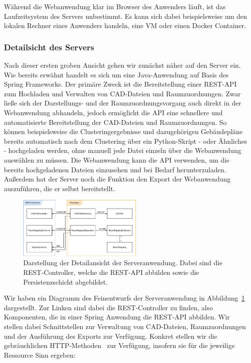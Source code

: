 Während die Webanwendung klar im Browser des Anwenders läuft, ist das Laufzeitsystem des Servers unbestimmt.
Es kann sich dabei beispielsweise um den lokalen Rechner eines Anwenders handeln, eine VM oder einen Docker Container.

\subsubsection{Detailsicht des Servers}
\label{subsubsec:detail-server}

Nach dieser ersten groben Ansicht gehen wir zunächst näher auf den Server ein.
Wie bereits erwähnt handelt es sich um eine Java-Anwendung auf Basis des Spring Frameworks.
Der primäre Zweck ist die Bereitstellung einer REST-API zum Hochladen und Verwalten von CAD-Dateien und Raumzuordnungen.
Zwar ließe sich der Darstellungs- und der Raumzuordnungsvorgang auch direkt in der Webanwendung abhandeln, jedoch ermöglicht die API eine schnellere und automatisierte Bereitstellung der CAD-Dateien und Raumzuordnungen.
So können beispielsweise die Clusteringergebnisse und dazugehörigen Gebäudepläne bereits automatisch nach dem Clustering über ein Python-Skript - oder Ähnliches - hochgeladen werden, ohne manuell jede Datei einzeln über die Webanwendung auswählen zu müssen.
Die Webanwendung kann die API verwenden, um die bereits hochgeladenen Dateien einzusehen und bei Bedarf herunterzuladen.
Außerdem hat der Server noch die Funktion den Export der Webanwendung auszuführen, die er selbst bereitstellt.

\begin{figure}[h]
    \includegraphics[width=0.55\textwidth]{res/server-architecture.pdf}
    \caption{Darstellung der Detailansicht der Serveranwendung.
    Dabei sind die REST-Controller, welche die REST-API abbilden sowie die Persistenzschicht abgebildet.}
    \label{fig:detail-view-server}
\end{figure}

Wir haben ein Diagramm des Feinentwurfs der Serveranwendung in Abbildung~\ref{fig:detail-view-server} dargestellt.
Zur Linken sind dabei die REST-Controller zu finden, also Komponenten, die in einer Spring Anwendung die REST-API abbilden.
Wir stellen dabei Schnittstellen zur Verwaltung von CAD-Dateien, Raumzuordnungen und der Ausführung des Exports zur Verfügung.
Konkret stellen wir die gebräuchlichen HTTP-Methoden~\cite{MozillaHTTPMethods} zur Verfügung, insofern sie für die jeweilige Ressource Sinn ergeben:

